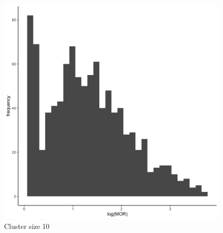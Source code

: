 \documentclass[
  letterpaper,
  DIV=11,
  numbers=noendperiod,
  titlepage]{scrartcl}
\begin{document}
\begin{figure}
\begin{minipage}[t]{0.24\linewidth}
{{\includegraphics{../../plots/two-lvl-ran-int/low-prev/hist_10_10_two_lvl_low_prev.png}

}

\caption{Cluster size 10}

}

\end{minipage}%
%
\begin{minipage}[t]{0.24\linewidth}

{\centering 

}
\end{minipage}
\end{figure}
\end{document}
